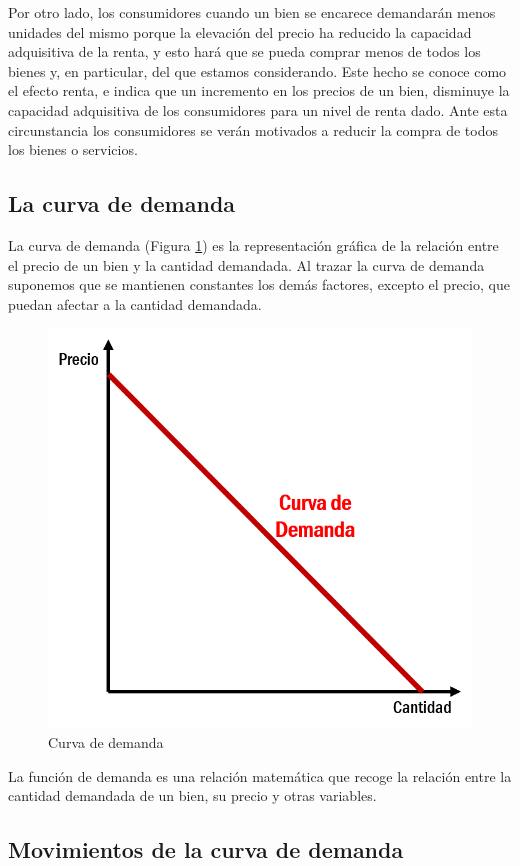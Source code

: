 \documentclass[
]{krantz}
\begin{document}
Por otro lado, los consumidores cuando un bien se encarece demandarán menos unidades del mismo porque la elevación del precio ha reducido la capacidad adquisitiva de la renta, y esto hará que se pueda comprar menos de todos los bienes y, en particular, del que estamos considerando. Este hecho se conoce como el efecto renta, e indica que un incremento en los precios de un bien, disminuye la capacidad adquisitiva de los consumidores para un nivel de renta dado. Ante esta circunstancia los consumidores se verán motivados a reducir la compra de todos los bienes o servicios.

\hypertarget{la-curva-de-demanda}{%
\subsection{La curva de demanda}\label{la-curva-de-demanda}}

La curva de demanda (Figura \ref{fig:12a-01}) es la representación gráfica de la relación entre el precio de un bien y la cantidad demandada. Al trazar la curva de demanda suponemos que se mantienen constantes los demás factores, excepto el precio, que puedan afectar a la cantidad demandada.

\begin{figure}

{\centering \includegraphics[width=0.5\linewidth]{images/12a-01} 

}

\caption{Curva de demanda}\label{fig:12a-01}
\end{figure}

La función de demanda es una relación matemática que recoge la relación entre la cantidad demandada de un bien, su precio y otras variables.

\hypertarget{movimientos-de-la-curva-de-demanda}{%
\subsection{Movimientos de la curva de demanda}\label{movimientos-de-la-curva-de-demanda}}
\end{document}
